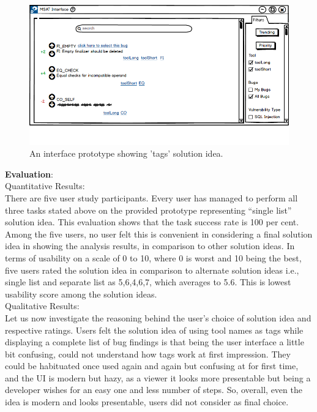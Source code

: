 \begin{figure}[hbt!]
	\centering
	\includegraphics[width=\linewidth]{figures/solution_ideas_snaps/S11_tags}
	\caption{An interface prototype showing 'tags' solution idea.}
	\label{fig:S11_tags}
\end{figure}

\textbf{Evaluation}: \\

Quantitative Results: \\

There are five user study participants. Every user has managed to perform all three tasks stated above on the provided prototype representing “single list” solution idea. This evaluation shows that the task success rate is 100 per cent. \\
Among the five users, no user felt this is convenient in considering a final solution idea in showing the analysis results, in comparison to other solution ideas.  In terms of usability on a scale of 0 to 10, where 0 is worst and 10 being the best, five users rated the solution idea in comparison to alternate solution ideas i.e., single list and separate list as 5,6,4,6,7, which averages to 5.6. This is lowest usability score among the solution ideas. \\

Qualitative Results: \\

Let us now investigate the reasoning behind the user’s choice of solution idea and respective ratings. Users felt the solution idea of using tool names as tags while displaying a complete list of bug findings is that being the user interface a little bit confusing, could not understand how tags work at first impression. They could be habituated once used again and again but confusing at for first time, and the UI is modern but hazy, as a viewer it looks more presentable but being a developer wishes for an easy one and less number of steps. So, overall, even the idea is modern and looks presentable, users did not consider as final choice. \\ \\



